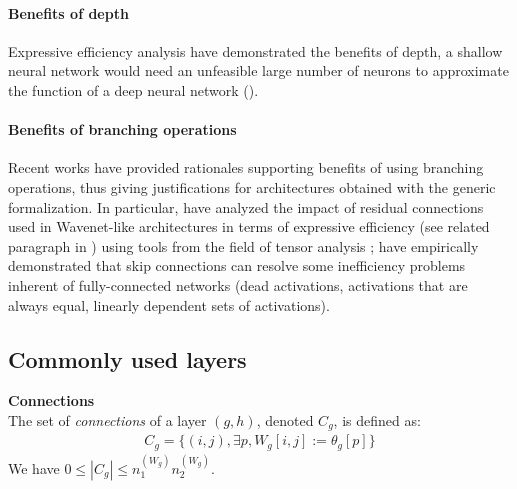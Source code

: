 \paragraph{Benefits of depth}
Expressive efficiency analysis have demonstrated the benefits of depth, \ie a shallow neural network would need an unfeasible large number of neurons to approximate the function of a deep neural network (\eg \cite{delalleau2011shallow,bianchini2014complexity,poggio2015theory,eldan2016power,poole2016exponential,raghu2016expressive,cohen2016convolutional,mhaskar2016learning,lin2017does,arora2018understanding}).


\paragraph{Benefits of branching operations}
Recent works have provided rationales supporting benefits of using branching operations, thus giving justifications for architectures obtained with the generic formalization. In particular, \citep{cohen2018boosting} have analyzed the impact of residual connections used in Wavenet-like architectures \citep{van2016wavenet} in terms of expressive efficiency (see related paragraph in ) using tools from the field of tensor analysis ; \citep{orhan2018skip} have empirically demonstrated that skip connections can resolve some inefficiency problems inherent of fully-connected networks (dead activations, activations that are always equal, linearly dependent sets of activations).


\subsection{Commonly used layers}

\begin{definition}\textbf{Connections}\\
The set of \emph{connections} of a layer $(g,h)$, denoted $C_g$, is defined as:
\begin{gather*}
  C_g = \{(i,j), \exists p, W_g[i,j] := \theta_g[p]\}
\end{gather*}
We have $0 \leq |C_g| \leq n_1^{(W_g)} n_2^{(W_g)}$.
\end{definition}

